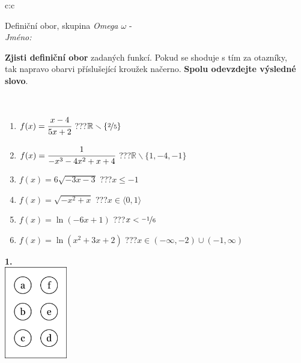 \documentclass[10pt]{report}
\begin{document}
\begin{tabular}{c:c}
\begin{minipage}[c][104.5mm][t]{0.5\linewidth}
\begin{center}
\vspace{7mm}
{\huge Definiční obor, skupina \textit{Omega $\omega$} -}\\[5mm]
\textit{Jméno:}\phantom{xxxxxxxxxxxxxxxxxxxxxxxxxxxxxxxxxxxxxxxxxxxxxxxxxxxxxxxxxxxxxxxxx}\\[5mm]
\begin{minipage}{0.95\linewidth}
\begin{center}
\textbf{Zjisti definiční obor} zadaných funkcí. Pokud se shoduje s tím za otazníky,\\tak napravo obarvi příslušející kroužek načerno. \textbf{Spolu odevzdejte výsledné slovo}.
\end{center}
\end{minipage}
\\[1mm]
\begin{minipage}{0.79\linewidth}
\begin{center}
\begin{varwidth}{\linewidth}
\begin{enumerate}
\normalsizerrr
\item $f(x)=\cfrac{x-4}{5x+2}$\quad \dotfill\; ???\;\dotfill \quad $\mathbb{R}\smallsetminus\{\nicefrac{2}{5}\}$
\item $f(x)=\cfrac{1}{-x^3-4x^2+x+4}$\quad \dotfill\; ???\;\dotfill \quad $\mathbb{R}\smallsetminus\{1,-4,-1\}$
\item $f(x)=6\sqrt{-3x-3}$\quad \dotfill\; ???\;\dotfill \quad $x\leq-1$
\item $f(x)=\sqrt{-x^2+x}$\quad \dotfill\; ???\;\dotfill \quad $x\in\langle0 , 1\rangle$
\item $f(x)=\ln{(-6x+1)}$\quad \dotfill\; ???\;\dotfill \quad $x<\nicefrac{-1}{6}$
\item $f(x)=\ln{(x^2+3x+2)}$\quad \dotfill\; ???\;\dotfill \quad $x\in(-\infty , -2)\cup(-1 , \infty)$
\end{enumerate}
\end{varwidth}
\end{center}
\end{minipage}
\begin{minipage}{0.20\linewidth}
\begin{center}
{\Huge\bfseries 1.} \\[2mm]
\includegraphics[height=40mm]{../images/braille.png}

\end{center}
\end{minipage}
\end{center}
\end{minipage}
\end{tabular}
\end{document}
